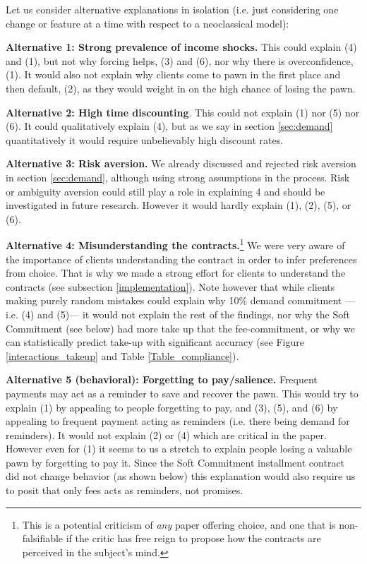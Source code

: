 \documentclass[oneside,11pt]{article}
\begin{document}
Let us consider alternative explanations in isolation (i.e. just considering one change or feature at a time with respect to a neoclassical model):

\vspace{.1in}
\noindent \textbf{Alternative 1: Strong prevalence of income shocks.} This could explain (4) and (1), but not why forcing helps, (3) and (6), nor why there is overconfidence, (1). It would also not explain why clients come to pawn in the first place and then default, (2), as they would weight in on the high chance of losing the pawn. 

\vspace{.1in}
\noindent \textbf{Alternative 2: High time discounting}. This could not explain (1) nor (5) nor (6). It could qualitatively explain (4), but as we say in section \ref{sec:demand} quantitatively it would require unbelievably high discount rates.


\vspace{.1in}
\noindent \textbf{Alternative 3: Risk aversion.} We already discussed and rejected risk aversion in section \ref{sec:demand}, although using strong assumptions in the process. Risk or ambiguity aversion could still play a role in explaining 4 and should be investigated in future research. However it would hardly explain (1), (2), (5), or (6).

\vspace{.1in}
\noindent \textbf{Alternative 4: Misunderstanding the contracts.}\footnote{This is a potential criticism of \textit{any} paper offering choice, and one that is non-falsifiable if the critic has free reign to propose how the contracts are perceived in the subject's mind.} We were very aware of the importance of clients understanding the contract in order to infer preferences from choice. That is why we made a strong effort for clients to understand the contracts (see subsection \ref{implementation}). Note however that while clients making purely random mistakes could explain why 10\% demand commitment ---i.e. (4) and (5)--- it would not explain the rest of the findings, nor why the Soft Commitment (see below) had more take up that the fee-commitment, or why we can statistically predict take-up with significant accuracy (see Figure \ref{interactions_takeup} and Table \ref{Table_compliance}).

\vspace{.1in}
\noindent \textbf{Alternative 5 (behavioral): Forgetting to pay/salience.} Frequent payments may act as a reminder to save and recover the pawn. This would try to explain (1) by appealing to people forgetting to pay, and (3), (5), and (6) by appealing to frequent payment acting as reminders (i.e. there being demand for reminders). It would not explain (2) or (4) which are critical in the paper. However even for (1) it seems to us a stretch to explain people losing a valuable pawn by forgetting to pay it. Since the Soft Commitment installment contract did not change behavior (as shown below) this explanation would also require us to posit that only fees acts as reminders, not promises.
\end{document}
